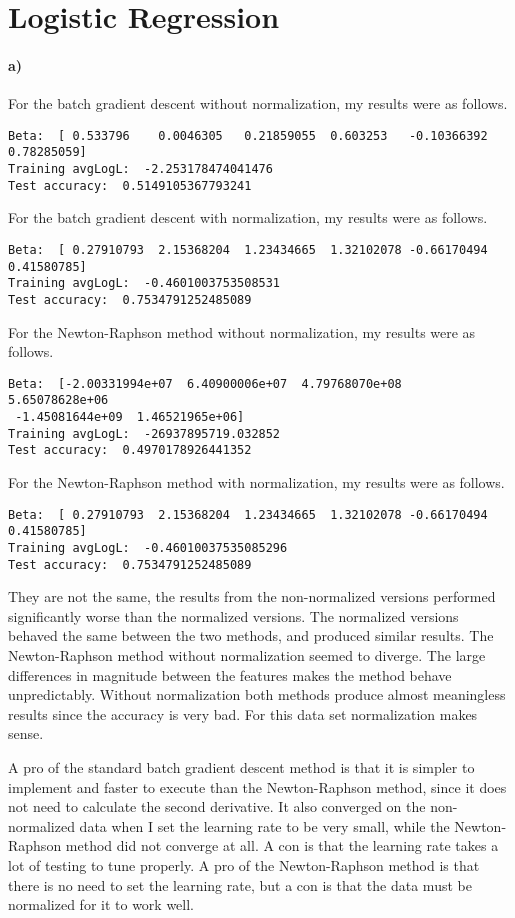 \documentclass[12pt]{article}
\begin{document}
\section{Logistic Regression}

\paragraph{a)}

For the batch gradient descent without normalization, my results were as follows.
\scriptsize
\begin{verbatim}
Beta:  [ 0.533796    0.0046305   0.21859055  0.603253   -0.10366392  0.78285059]
Training avgLogL:  -2.253178474041476
Test accuracy:  0.5149105367793241
\end{verbatim}
\normalsize
For the batch gradient descent with normalization, my results were as follows.
\scriptsize
\begin{verbatim}
Beta:  [ 0.27910793  2.15368204  1.23434665  1.32102078 -0.66170494  0.41580785]
Training avgLogL:  -0.4601003753508531
Test accuracy:  0.7534791252485089
\end{verbatim}
\normalsize
For the Newton-Raphson method without normalization, my results were as follows.
\scriptsize
\begin{verbatim}
Beta:  [-2.00331994e+07  6.40900006e+07  4.79768070e+08  5.65078628e+06
 -1.45081644e+09  1.46521965e+06]
Training avgLogL:  -26937895719.032852
Test accuracy:  0.4970178926441352
\end{verbatim}
\normalsize
For the Newton-Raphson method with normalization, my results were as follows.
\scriptsize
\begin{verbatim}
Beta:  [ 0.27910793  2.15368204  1.23434665  1.32102078 -0.66170494  0.41580785]
Training avgLogL:  -0.46010037535085296
Test accuracy:  0.7534791252485089
\end{verbatim}
\normalsize
They are not the same, the results from the non-normalized versions performed significantly worse than the normalized versions.
The normalized versions behaved the same between the two methods, and produced similar results. The Newton-Raphson method without normalization
seemed to diverge. The large differences in magnitude between the features makes the method behave unpredictably. Without normalization both methods
produce almost meaningless results since the accuracy is very bad. For this data set normalization makes sense.

A pro of the standard batch gradient descent method is that it is simpler to implement and faster to execute than the Newton-Raphson method, since
it does not need to calculate the second derivative. It also converged on the non-normalized data when I set the learning rate to be very small,
while the Newton-Raphson method did not converge at all. A con is that the learning rate takes a lot of testing to tune properly. A pro of the
Newton-Raphson method is that there is no need to set the learning rate, but a con is that the data must be normalized for it to work well.
\end{document}
